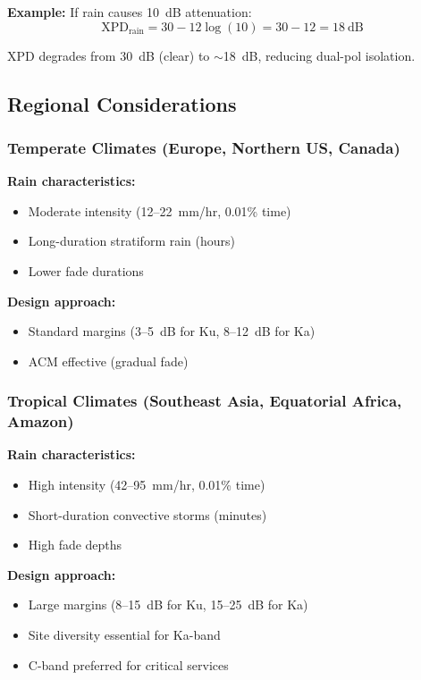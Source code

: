 \textbf{Example:} If rain causes 10~dB attenuation:
\begin{equation}
\text{XPD}_{\text{rain}} = 30 - 12\log(10) = 30 - 12 = 18~\text{dB}
\end{equation}

XPD degrades from 30~dB (clear) to $\sim$18~dB, reducing dual-pol isolation.

\subsection{Regional Considerations}

\subsubsection{Temperate Climates (Europe, Northern US, Canada)}

\textbf{Rain characteristics:}
\begin{itemize}
\item Moderate intensity (12--22~mm/hr, 0.01\% time)
\item Long-duration stratiform rain (hours)
\item Lower fade durations
\end{itemize}

\textbf{Design approach:}
\begin{itemize}
\item Standard margins (3--5~dB for Ku, 8--12~dB for Ka)
\item ACM effective (gradual fade)
\end{itemize}

\subsubsection{Tropical Climates (Southeast Asia, Equatorial Africa, Amazon)}

\textbf{Rain characteristics:}
\begin{itemize}
\item High intensity (42--95~mm/hr, 0.01\% time)
\item Short-duration convective storms (minutes)
\item High fade depths
\end{itemize}

\textbf{Design approach:}
\begin{itemize}
\item Large margins (8--15~dB for Ku, 15--25~dB for Ka)
\item Site diversity essential for Ka-band
\item C-band preferred for critical services
\end{itemize}

